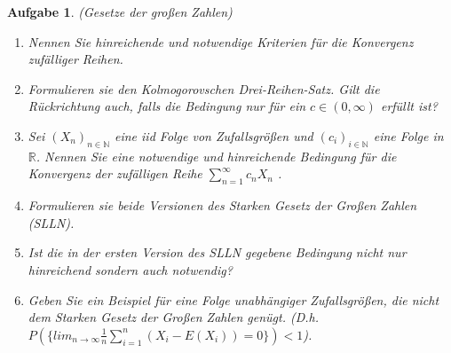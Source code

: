\documentclass[11pt, a4paper, ngerman]{article}
\newcommand{\N}{\mathbb{N}}
\newcommand{\R}{\mathbb{R}}
\newtheorem{aufgabe}{Aufgabe}
\begin{document}
\begin{aufgabe} (Gesetze der großen Zahlen)
    \begin{enumerate}
        \item 
        Nennen Sie hinreichende und notwendige Kriterien für die Konvergenz zufälliger Reihen. 
        \item
        Formulieren sie den Kolmogorovschen Drei-Reihen-Satz. Gilt die Rückrichtung auch, falls die Bedingung nur für ein $c \in (0, \infty)$ erfüllt ist?
        \item 
        Sei $(X_n)_{n \in \N}$ eine iid Folge von Zufallsgrößen und $(c_i)_{i \in \N}$ eine Folge in $\R$. 
        Nennen Sie eine notwendige und hinreichende Bedingung für die Konvergenz der zufälligen Reihe $\sum_{n=1}^{\infty} c_n X_n$ .  
        \item 
        Formulieren sie beide Versionen des Starken Gesetz der Großen Zahlen (SLLN).
        \item
        Ist die in der ersten Version des SLLN gegebene Bedingung nicht nur hinreichend sondern auch notwendig?
        \item 
        Geben Sie ein Beispiel für eine Folge unabhängiger Zufallsgrößen, die nicht dem Starken Gesetz der Großen Zahlen genügt. 
        \newline   
        (D.h. $P( \{ lim_{n \to \infty} \frac{1}{n}\sum_{i=1}^n (X_i - E(X_i)) = 0 \} ) < 1$). 
    \end{enumerate} 
\end{aufgabe}
\end{document}
